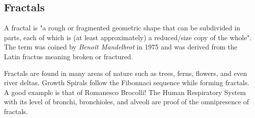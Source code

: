 \documentclass{resonance}
\begin{document}
\subsection*{Fractals}


A fractal is "a rough or fragmented geometric shape that can be subdivided in parts, each of which is (at least approximately) a reduced/size copy of the whole". The term was coined by \textit{Benoît Mandelbrot} in 1975 and was derived from the Latin fractus meaning broken or fractured.

Fractals are found in many areas of nature such as trees, ferns, flowers, and even river deltas. Growth Spirals follow the Fibonnaci sequence while forming fractals. A good example is that of Romanesco Brocolli! The Human Respiratory System with its level of bronchi, bronchioles, and alveoli are proof of the omnipresence of fractals.
\end{document}
